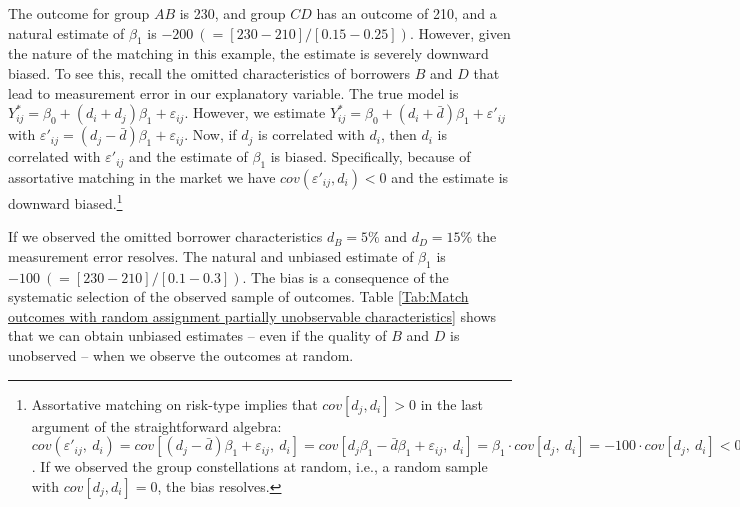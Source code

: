 The outcome for group $AB$ is 230, and group $CD$ has an outcome of 210, and a natural estimate of $\beta_1$ is $-200 \  (=[230-210]/[0.15-0.25])$. However, given the nature of the matching in this example, the estimate is severely downward biased.
To see this, recall the omitted characteristics of borrowers $B$ and $D$ that lead to measurement error in our explanatory variable.
The true model is $Y^*_{ij} = \beta_0 + (d_i + d_j)\beta_1 + \varepsilon_{ij}$. However, we estimate $Y^*_{ij} = \beta_0 + (d_i+\bar d)\beta_1 + \varepsilon'_{ij}$ with  $\varepsilon'_{ij}=(d_j-\bar d)\beta_1 + \varepsilon_{ij}$. Now, if $d_j$ is correlated with $d_i$, then $d_i$ is correlated with $\varepsilon'_{ij}$ and the estimate of $\beta_1$ is biased. 
Specifically, because of assortative matching in the market we have $cov(\varepsilon'_{ij}, d_i)<0$ and the estimate is downward biased.\footnote{
Assortative matching on risk-type implies that $cov[d_j,d_i]>0$ in the last argument of the straightforward algebra:
$cov(\varepsilon'_{ij}, \ d_i) = cov[(d_j - \bar d)\beta_1 + \varepsilon_{ij}, \ d_i]
= cov[d_j\beta_1 - \bar d\beta_1 + \varepsilon_{ij}, \ d_i]
= \beta_1 \cdot cov[d_j , \ d_i]
= -100 \cdot cov[d_j , \ d_i] <0$.
If we observed the group constellations at random, i.e., a random sample with $cov[d_j,d_i]=0$, the bias resolves.}

If we observed the omitted borrower characteristics $d_B=5\%$ and $d_D=15\%$ the measurement error resolves. The natural and unbiased estimate of $\beta_1$ is $-100 \ (=[230-210]/[0.1-0.3])$.
The bias is a consequence of the systematic selection of the observed sample of outcomes. Table \ref{Tab:Match outcomes with random assignment partially unobservable characteristics} shows that we can obtain unbiased estimates -- even if the quality of $B$ and $D$ is unobserved -- when we observe the outcomes at random. 

